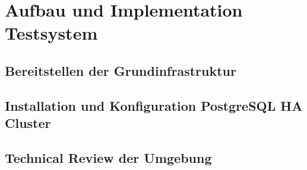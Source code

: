 
\section{Aufbau und Implementation Testsystem}
\subsection{Bereitstellen der Grundinfrastruktur}
\subsection{Installation und Konfiguration PostgreSQL HA Cluster}
\subsection{Technical Review der Umgebung}